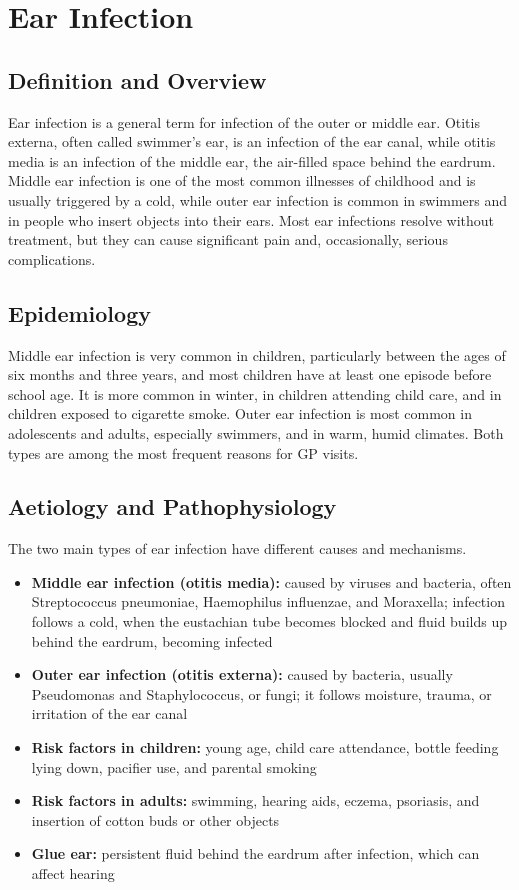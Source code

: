 \chapter{Ear Infection}

\section*{Definition and Overview}
Ear infection is a general term for infection of the outer or middle ear. Otitis externa, often called swimmer's ear, is an infection of the ear canal, while otitis media is an infection of the middle ear, the air-filled space behind the eardrum. Middle ear infection is one of the most common illnesses of childhood and is usually triggered by a cold, while outer ear infection is common in swimmers and in people who insert objects into their ears. Most ear infections resolve without treatment, but they can cause significant pain and, occasionally, serious complications.

\section*{Epidemiology}
Middle ear infection is very common in children, particularly between the ages of six months and three years, and most children have at least one episode before school age. It is more common in winter, in children attending child care, and in children exposed to cigarette smoke. Outer ear infection is most common in adolescents and adults, especially swimmers, and in warm, humid climates. Both types are among the most frequent reasons for GP visits.

\section*{Aetiology and Pathophysiology}
The two main types of ear infection have different causes and mechanisms.
\begin{itemize}
    \item \textbf{Middle ear infection (otitis media):} caused by viruses and bacteria, often Streptococcus pneumoniae, Haemophilus influenzae, and Moraxella; infection follows a cold, when the eustachian tube becomes blocked and fluid builds up behind the eardrum, becoming infected
    \item \textbf{Outer ear infection (otitis externa):} caused by bacteria, usually Pseudomonas and Staphylococcus, or fungi; it follows moisture, trauma, or irritation of the ear canal
    \item \textbf{Risk factors in children:} young age, child care attendance, bottle feeding lying down, pacifier use, and parental smoking
    \item \textbf{Risk factors in adults:} swimming, hearing aids, eczema, psoriasis, and insertion of cotton buds or other objects
    \item \textbf{Glue ear:} persistent fluid behind the eardrum after infection, which can affect hearing
\end{itemize}

